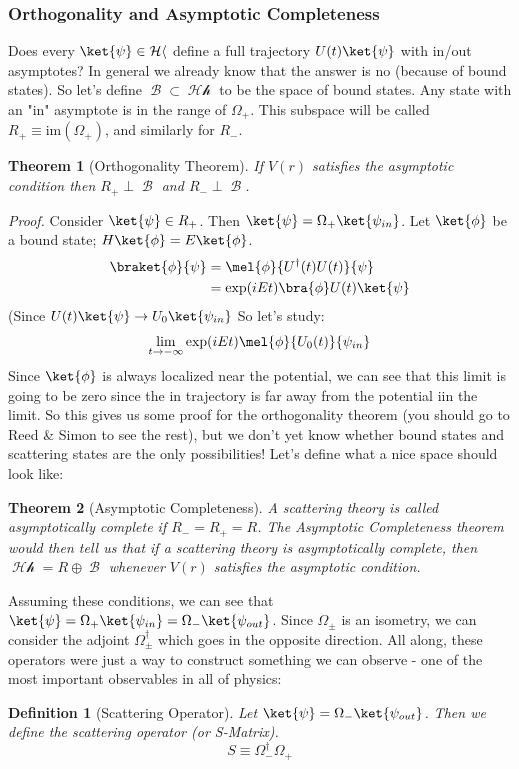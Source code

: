 \documentclass{article}
\DeclareMathOperator{\Bb}{\mathcal{B}}
\DeclareMathOperator{\Hh}{\mathcal{Hh}}
\newtheorem{defn}{Definition}
\newtheorem{thm}{Theorem}
\begin{document}
\subsubsection{Orthogonality and Asymptotic Completeness}
Does every $\ket{\psi} \in \Hh$ define a full trajectory $U(t)\ket{\psi}$ with in/out asymptotes? In general we already know that the answer is no (because of bound states). So let's define $\Bb \subset \Hh$ to be the space of bound states. Any state with an "in" asymptote is in the range of $\Omega_+$. This subspace will be called $R_+ \equiv \textrm{im}(\Omega_+)$, and similarly for $R_-$.
\begin{thm}[Orthogonality Theorem] If $V(r)$ satisfies the asymptotic condition then $R_+ \perp \Bb$ and $R_- \perp \Bb$.
\end{thm}
\textit{Proof.} Consider $\ket{\psi}\in R_+$. Then $\ket{\psi}=\Omega_+ \ket{\psi_{in}}$. Let $\ket{\phi}$ be a bound state; $H\ket{\phi}=E\ket{\phi}$.
\begin{align}
\braket{\phi}{\psi}&=\mel{\phi}{U^\dagger(t) U(t)}{\psi}\\
&= \exp(iEt)\bra{\phi}U(t)\ket{\psi}\\
\end{align}
(Since $U(t)\ket{\psi}\to U_0\ket{\psi_{in}}$ So let's study:
\[\lim_{t\to-\infty}\exp(iEt)\mel{\phi}{U_0(t)}{\psi_{in}}\]
Since $\ket{\phi}$ is always localized near the potential, we can see that this limit is going to be zero since the in trajectory is far away from the potential iin the limit. So this gives us some proof for the orthogonality theorem (you should go to Reed \& Simon to see the rest), but we don't yet know whether bound states and scattering states are the only possibilities! Let's define what a nice space should look like:
\begin{thm}[Asymptotic Completeness]
A scattering theory is called asymptotically complete if $R_-=R_+ = R$. The Asymptotic Completeness theorem would then tell us that if a scattering theory is asymptotically complete, then $\Hh=R\oplus \Bb$ whenever $V(r)$ satisfies the asymptotic condition. 
\end{thm}
Assuming these conditions, we can see that $\ket{\psi} = \Omega_+ \ket{\psi_{in}} = \Omega_- \ket{\psi_{out}}$. Since $\Omega_\pm$ is an isometry, we can consider the adjoint $\Omega_\pm^\dagger$ which goes in the opposite direction. All along, these operators were just a way to construct something we can observe - one of the most important observables in all of physics:
\begin{defn}[Scattering Operator] Let $\ket{\psi}=\Omega_-\ket{\psi_{out}}$. Then we define the scattering operator (or S-Matrix).
\begin{equation}S \equiv \Omega_-^\dagger \Omega_+\end{equation}
\end{defn}
\end{document}
